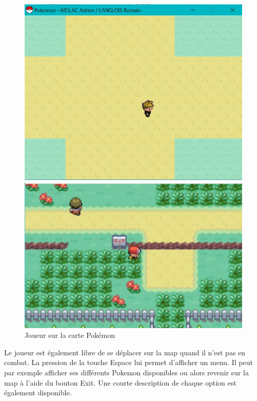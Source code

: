 \documentclass[a4paper,twoside, openany,11pt]{book}
\begin{document}
\begin{figure}[!h]
\begin{minipage}{0.49\textwidth}
\includegraphics[scale = 0.6]{Images/map.jpg}
\end{minipage}
\begin{minipage}{0.49\textwidth}
\includegraphics[scale = 0.84]{Images/vrai_jeu_map.jpg}
\end{minipage}
\caption{Joueur sur la carte Pokémon}
\end{figure}


Le joueur est également libre de se déplacer sur la map quand il n'est pas en combat. La pression de la touche Espace lui permet d'afficher un menu. Il peut par exemple afficher ses différents Pokemon disponibles ou alors revenir sur la map à l'aide du bouton Exit. Une courte description de chaque option est également disponible.
\end{document}
